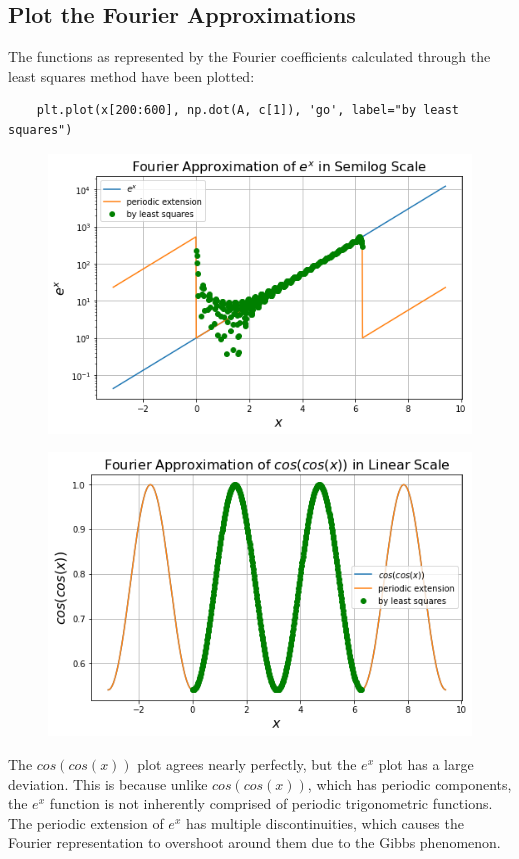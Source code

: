 \documentclass[12pt, a4paper]{article}
\begin{document}
\subsection{Plot the Fourier Approximations}
The functions as represented by the Fourier coefficients calculated through the least squares method
have been plotted:
\begin{lstlisting}
    plt.plot(x[200:600], np.dot(A, c[1]), 'go', label="by least squares")
\end{lstlisting}
\begin{figure}[H]
    \centering
    \includegraphics[scale=0.6]{7a.png}
\end{figure}
\begin{figure}[H]
    \centering
    \includegraphics[scale=0.6]{7b.png}
\end{figure}

The $cos(cos(x))$ plot agrees nearly perfectly, but the $e^x$ plot has a large deviation.
This is because unlike $cos(cos(x))$, which has periodic components, the $e^x$ function
is not inherently comprised of periodic trigonometric functions. The periodic extension of $e^x$
has multiple discontinuities, which causes the Fourier representation to overshoot around them
due to the Gibbs phenomenon.
\end{document}
